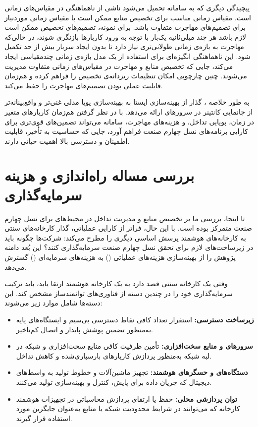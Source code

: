 پیچیدگی دیگری که به سامانه تحمیل می‌شود ناشی از ناهماهنگی در مقیاس‌های زمانی است. مقیاس زمانی مناسب برای تخصیص منابع ممکن است با مقیاس زمانی موردنیاز برای تصمیم‌های مهاجرت متفاوت باشد. برای نمونه، تصمیم‌های تخصیص ممکن است لازم باشد هر چند میلی‌ثانیه یک‌بار با توجه به ورود کاربارها بازنگری شوند، در حالی‌که مهاجرت به بازه‌ی زمانی طولانی‌تری نیاز دارد تا بدون ایجاد سربار بیش از حد تکمیل شود. این ناهماهنگی انگیزه‌ای برای استفاده از یک مدل بازه‌ی زمانی چندمقیاسی ایجاد می‌کند، جایی که تخصیص منابع و مهاجرت در مقیاس‌های زمانی متفاوت مدیریت می‌شوند. چنین چارچوبی امکان تنظیمات ریزدانه‌ی تخصیص را فراهم کرده و هم‌زمان قابلیت عملی بودن تصمیم‌های مهاجرت را حفظ می‌کند.

به طور خلاصه ، گذار از بهینه‌سازی ایستا به بهینه‌سازی پویا مدلی غنی‌تر و واقع‌بینانه‌تر از جانمایی کانتینر در سرورهای  ارائه می‌دهد. با در نظر گرفتن هم‌زمان کاربارهای متغیر در زمان، پویایی تداخل، و هزینه‌های مهاجرت، سامانه می‌تواند تضمین‌های قوی‌تری برای کارایی برنامه‌های نسل چهارم صنعت فراهم آورد، جایی که حساسیت به تأخیر، قابلیت اطمینان و دسترسی بالا اهمیت حیاتی دارند. 

\section{بررسی مساله راه‌اندازی و هزینه سرمایه‌گذاری}

تا اینجا، بررسی ما بر تخصیص منابع و مدیریت تداخل در محیط‌های  برای نسل چهارم صنعت متمرکز بوده است. با این حال، فراتر از کارایی عملیاتی، گذار کارخانه‌های سنتی به کارخانه‌های هوشمند پرسش اساسی دیگری را مطرح می‌کند: شرکت‌ها چگونه باید در زیرساخت‌های لازم برای تحقق نسل چهارم صنعت سرمایه‌گذاری کنند؟ این بُعد دامنه پژوهش را از بهینه‌سازی هزینه‌های عملیاتی  () به هزینه‌های سرمایه‌ای () گسترش می‌دهد.

وقتی یک کارخانه سنتی قصد دارد به یک کارخانه هوشمند ارتقا یابد، باید ترکیب سرمایه‌گذاری خود را در چندین دسته از فناوری‌های توانمندساز مشخص کند. این دسته‌ها شامل موارد زیر می‌شوند:

\begin{itemize}
\item
\textbf{زیرساخت دسترسی:} استقرار تعداد کافی نقاط دسترسی بی‌سیم و ایستگاه‌های پایه به‌منظور تضمین پوشش پایدار و اتصال کم‌تأخیر.

\item
\textbf{سرورهای  و منابع سخت‌افزاری:} تأمین ظرفیت کافی منابع سخت‌افزاری و شبکه در لبه شبکه به‌منظور پردازش کاربارهای بار‌سپاری‌شده و کاهش تداخل.

\item
\textbf{دستگاه‌های  و حسگرهای هوشمند:} تجهیز ماشین‌آلات و خطوط تولید به واسط‌های دیجیتال که جریان داده برای پایش، کنترل و بهینه‌سازی تولید می‌کنند.

\item
\textbf{توان پردازشی محلی:} حفظ یا ارتقای پردازش محاسباتی در تجهیزات هوشمند کارخانه که می‌توانند در شرایط محدودیت شبکه یا منابع  به‌عنوان جایگزین مورد استفاده قرار گیرند.
\end{itemize}

